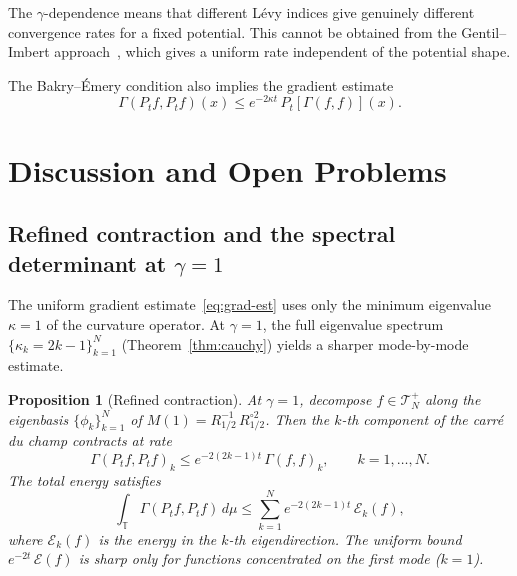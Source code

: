 \documentclass[11pt,a4paper]{article}
\theoremstyle{plain}
\newtheorem{proposition}[theorem]{Proposition}
\theoremstyle{definition}
\theoremstyle{remark}
\newcommand{\T}{\mathbb{T}}
\begin{document}
The $\gamma$-dependence means that different L\'evy indices give
genuinely different convergence rates for a fixed potential.
This cannot be obtained from the
Gentil--Imbert approach~\cite{GentilImbert2008}, which gives
a uniform rate independent of the potential shape.

The Bakry--\'Emery condition also implies the gradient estimate
\begin{equation}\label{eq:grad-est}
  \Gamma(P_t f, P_t f)(x) \leq e^{-2\kappa t}\,P_t[\Gamma(f,f)](x).
\end{equation}


\section{Discussion and Open Problems}\label{sec:discussion}

\subsection{Refined contraction and the spectral determinant at $\gamma = 1$}

The uniform gradient estimate~\eqref{eq:grad-est} uses only
the minimum eigenvalue $\kappa = 1$ of the curvature operator.
At $\gamma = 1$, the full eigenvalue spectrum
$\{\kappa_k = 2k-1\}_{k=1}^N$ (Theorem~\ref{thm:cauchy})
yields a sharper mode-by-mode estimate.

\begin{proposition}[Refined contraction]\label{prop:refined}
At $\gamma = 1$, decompose $f \in \mathcal{T}_N^+$ along the
eigenbasis $\{\phi_k\}_{k=1}^N$ of $M(1) = R_{1/2}^{-1}\,R_{1/2}^{\circ 2}$.
Then the $k$-th component of the carr\'e du champ contracts at rate
\begin{equation}\label{eq:refined-contraction}
  \Gamma(P_t f, P_t f)_k \leq e^{-2(2k-1)t}\,\Gamma(f,f)_k,
  \qquad k = 1,\ldots,N.
\end{equation}
The total energy satisfies
\begin{equation}\label{eq:total-energy}
  \int_\T \Gamma(P_t f, P_t f)\,d\mu
  \leq \sum_{k=1}^N e^{-2(2k-1)t}\,\mathcal{E}_k(f),
\end{equation}
where $\mathcal{E}_k(f)$ is the energy in the $k$-th eigendirection.
The uniform bound $e^{-2t}\,\mathcal{E}(f)$ is sharp only for
functions concentrated on the first mode ($k=1$).
\end{proposition}
\end{document}
